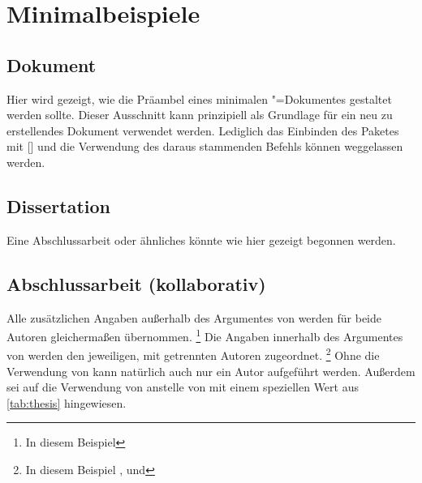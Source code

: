 \chapter{Minimalbeispiele}
%
%
%
\section{Dokument}
%
%
Hier wird gezeigt, wie die Präambel eines minimalen "=Dokumentes 
gestaltet werden sollte. Dieser Ausschnitt kann prinzipiell als Grundlage für 
ein neu zu erstellendes Dokument verwendet werden. Lediglich das Einbinden des 
Paketes  mit [] und 
die Verwendung des daraus stammenden Befehls  können 
weggelassen werden.

\section{Dissertation}
%
%
%
Eine Abschlussarbeit oder ähnliches könnte wie hier gezeigt begonnen werden.

\section{Abschlussarbeit (kollaborativ)}
%
%
%
%
Alle zusätzlichen Angaben außerhalb des Argumentes von  werden 
für beide Autoren gleichermaßen übernommen.%
\footnote{In diesem Beispiel }
Die Angaben innerhalb des Argumentes von  werden den jeweiligen, 
mit  getrennten Autoren zugeordnet.%
\footnote{%
  In diesem Beispiel ,  und 
}
Ohne die Verwendung von  kann natürlich auch nur ein Autor 
aufgeführt werden. Außerdem sei auf die Verwendung von  anstelle 
von  mit einem speziellen Wert aus \autoref{tab:thesis} 
hingewiesen.

